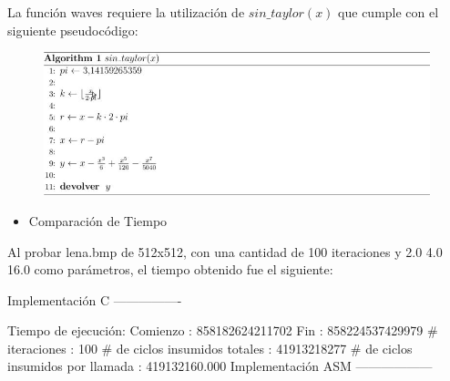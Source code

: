 \documentclass[10pt, a4paper]{article}
\begin{document}
\begin{itemize}
La función waves requiere la utilización de $sin\_taylor(x)$ que cumple con el siguiente pseudocódigo:
\begin{figure}[H] %
\begin{center}
\includegraphics[width=400pt]{./algoritmo_waves.jpg}
\end{center}
\end{figure}

\begin{itemize}
\item{Comparación de Tiempo}
\end{itemize}
Al probar lena.bmp de 512x512, con una cantidad de 100 iteraciones y 2.0 4.0 16.0 como parámetros, el tiempo obtenido fue el siguiente:\newline

Implementación C\newline
----------------\newline

Tiempo de ejecución:\newline
  Comienzo                          : 858182624211702\newline
  Fin                               : 858224537429979\newline
  \# iteraciones                     : 100\newline
  \# de ciclos insumidos totales     : 41913218277\newline
  \# de ciclos insumidos por llamada : 419132160.000\newline
\newline
Implementación ASM\newline
------------------\newline


\end{itemize}
\end{document}
